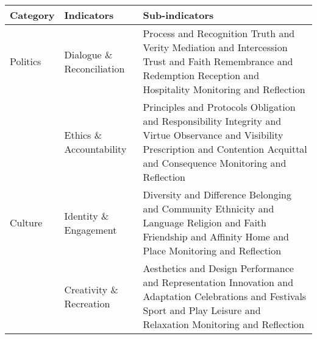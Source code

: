 \begin{table}[th]
\begin{center}
\begin{tabular}{ >{\raggedright\arraybackslash}p{} >{\raggedright\arraybackslash}p{} >{\raggedright\arraybackslash}p{} }
\hline
Category & Indicators & Sub-indicators \\
\hline
Politics & Dialogue \& Reconciliation & Process and Recognition \linebreak Truth and Verity \linebreak Mediation and Intercession \linebreak Trust and Faith \linebreak Remembrance and Redemption \linebreak Reception and Hospitality \linebreak Monitoring and Reflection \linebreak \\
  & Ethics \& Accountability & Principles and Protocols \linebreak Obligation and Responsibility \linebreak Integrity and Virtue \linebreak Observance and Visibility \linebreak Prescription and Contention \linebreak Acquittal and Consequence \linebreak Monitoring and Reflection \linebreak \\
\hline
Culture & Identity \& Engagement & Diversity and Difference \linebreak Belonging and Community \linebreak Ethnicity and Language \linebreak Religion and Faith \linebreak Friendship and Affinity \linebreak Home and Place \linebreak Monitoring and Reflection \linebreak \\
  & Creativity \& Recreation & Aesthetics and Design \linebreak Performance and Representation \linebreak Innovation and Adaptation \linebreak Celebrations and Festivals \linebreak Sport and Play \linebreak Leisure and Relaxation \linebreak Monitoring and Reflection \linebreak \\

\end{tabular}
\end{center}
\end{table}
